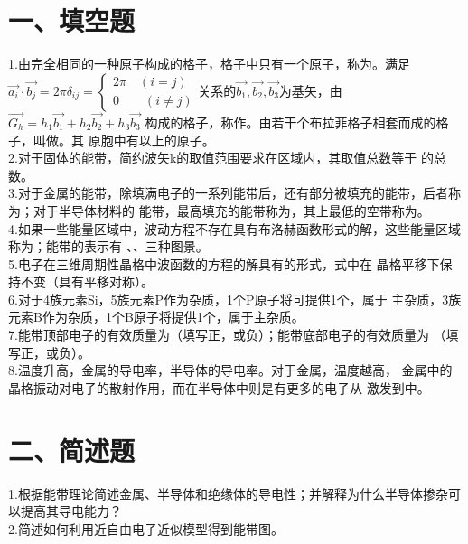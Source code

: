 \documentclass[UTF8]{ctexart}
\begin{document}
\section*{一、填空题}
1.由完全相同的一种原子构成的格子，格子中只有一个原子，称为\uline{\makebox[7em]{}}。满足$\vec{a_i}\cdot\vec{b_j}
=2\pi\delta_{ij}=\begin{cases}
    2\pi\quad(i=j)\\
    0\quad\quad(i\neq j)
\end{cases}$关系的$\vec{b_1},\vec{b_2},\vec{b_3}$为基矢，由$\vec{G_h}=h_1\vec{b_1}+h_2\vec{b_2}+h_3\vec{b_3}$
构成的格子，称作\uline{\makebox[4em]{}}。由若干个布拉菲格子相套而成的格子，叫做\uline{\makebox[6em]{}}。其
原胞中有\uline{\makebox[3em]{}}以上的原子。\\
2.对于固体的能带，简约波矢k的取值范围要求在\uline{\makebox[9em]{}}区域内，其取值总数等于\uline{\makebox[3em]{}}
的总数。\\
3.对于金属的能带，除填满电子的一系列能带后，还有部分被填充的能带，后者称为\uline{\makebox[3em]{}}；对于半导体材料的
能带，最高填充的能带称为\uline{\makebox[3em]{}}，其上最低的空带称为\uline{\makebox[3em]{}}。\\
4.如果一些能量区域中，波动方程不存在具有布洛赫函数形式的解，这些能量区域称为\uline{\makebox[3em]{}}；能带的表示有
\uline{\makebox[12em]{}}、\uline{\makebox[12em]{}}、\uline{\makebox[12em]{}}三种图景。\\
5.电子在三维周期性晶格中波函数的方程的解具有\uline{\makebox[15em]{}}的形式，式中\uline{\makebox[4em]{}}在
晶格平移下保持不变（具有平移对称）。\\
6.对于4族元素Si，5族元素P作为杂质，1个P原子将可提供1个\uline{\makebox[3em]{}}，属于\uline{\makebox[2em]{}}
主杂质，3族元素B作为杂质，1个B原子将提供1个\uline{\makebox[3em]{}}，属于\uline{\makebox[2em]{}}主杂质。\\
7.能带顶部电子的有效质量为\uline{\makebox[2em]{}}（填写正，或负）；能带底部电子的有效质量为\uline{\makebox[2em]{}}
（填写正，或负）。\\
8.温度升高，金属的导电率\uline{\makebox[3em]{}}，半导体的导电率\uline{\makebox[3em]{}}。对于金属，温度越高，
金属中的晶格振动对电子的散射作用\uline{\makebox[3em]{}}，而在半导体中则是有更多的电子从\uline{\makebox[3em]{}}
激发到\uline{\makebox[3em]{}}中。\\
\section*{二、简述题}
1.根据能带理论简述金属、半导体和绝缘体的导电性；并解释为什么半导体掺杂可以提高其导电能力？\\
2.简述如何利用近自由电子近似模型得到能带图。\\
\end{document}
